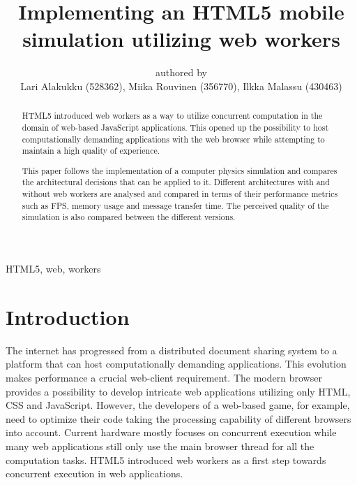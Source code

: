 \documentclass[conference]{IEEEtran}
\begin{document}
\title{Implementing an HTML5 mobile simulation utilizing web workers}

\author{authored by\\
        Lari Alakukku (528362),
        Miika Rouvinen (356770),
        Ilkka Malassu (430463)}%

\makeatletter         
\def\@maketitle{
\begin{center}
{\Huge \bfseries \sffamily \@title }\\[4ex] 
Submitted on \@date\\
{\normalsize \@author}\\[4ex] 
\end{center}}
\makeatother


\maketitle

\begin{IEEEkeywords}
HTML5, web, workers
\end{IEEEkeywords}

\begin{abstract}

HTML5 introduced web workers as a way to utilize concurrent computation in the domain of web-based JavaScript applications. This opened up the possibility to host 
computationally demanding applications with the web browser while attempting to maintain a high quality of experience.

This paper follows the implementation of a computer physics simulation and compares the architectural decisions that can be applied to it. Different architectures with and 
without web workers are analysed and compared in terms of their performance metrics such as FPS, memory usage and message transfer time. The perceived quality of the
simulation is also compared between the different versions.
 
\end{abstract}

\section{Introduction}
\label{chap:introduction}

The internet has progressed from a distributed document sharing system to a platform that can host computationally demanding applications. This evolution makes performance a crucial web-client requirement. The modern browser provides a possibility to develop intricate web applications utilizing only HTML, CSS and JavaScript. However, the developers of a web-based game, for example, need to optimize their code taking the processing capability of different browsers into account. Current hardware mostly focuses on concurrent execution while many web applications still only use the main browser thread for all the computation tasks. HTML5 introduced web workers as a first step towards concurrent execution in web applications. \cite{doha}
\end{document}
